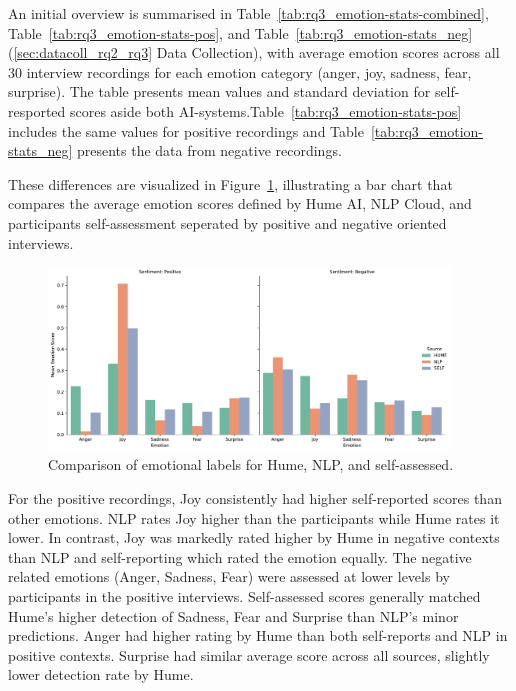 An initial overview is summarised in Table~\ref{tab:rq3_emotion-stats-combined}, Table~\ref{tab:rq3_emotion-stats-pos}, and Table~\ref{tab:rq3_emotion-stats_neg} (\ref{sec:datacoll_rq2_rq3} Data Collection),
with average emotion scores across all 30 interview recordings for each emotion category (anger, joy, sadness, fear, surprise). The table presents mean values and standard deviation for self-resported scores 
aside both AI-systems.Table~\ref{tab:rq3_emotion-stats-pos} includes the same values for positive recordings and Table~\ref{tab:rq3_emotion-stats_neg} presents the data from negative recordings.

These differences are visualized in Figure~\ref{fig:comp-bar-rq3-all}, illustrating a bar chart that compares the average emotion scores defined by 
Hume AI, NLP Cloud, and participants self-assessment seperated by positive and negative oriented interviews.

\begin{figure}[!h]
    \centering
    \includegraphics[width=0.95\textwidth]{png/results/rq3/rq3_sentiment_grouped_bar.pdf}
    \caption{Comparison of emotional labels for Hume, NLP, and self-assessed.}
    \label{fig:comp-bar-rq3-all}
\end{figure}

For the positive recordings, Joy consistently had higher self-reported scores than other emotions. NLP rates Joy higher than the participants while Hume rates it lower. 
In contrast, Joy was markedly rated higher by Hume in negative contexts than NLP and self-reporting which rated the emotion equally. The negative related emotions (Anger, Sadness, Fear) were assessed at lower levels by participants in the positive interviews. 
Self-assessed scores generally matched Hume’s higher detection of Sadness, Fear and Surprise than NLP’s minor predictions. Anger had higher rating by Hume than both self-reports and NLP in positive contexts. 
Surprise had similar average score across all sources, slightly lower detection rate by Hume. 

